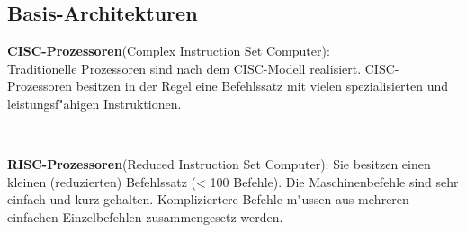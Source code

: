 \subsection{Basis-Architekturen}
\begin{minipage}{9cm}
	\textbf{CISC-Prozessoren}(Complex Instruction Set Computer):\\
	Traditionelle Prozessoren sind nach dem CISC-Modell realisiert. CISC-Prozessoren besitzen in der Regel eine Befehlssatz mit vielen spezialisierten und leistungsf"ahigen Instruktionen.
\end{minipage}
%
\begin{minipage}{0.5cm}
	\ \
\end{minipage}
%
\begin{minipage}{9cm}
	\textbf{RISC-Prozessoren}(Reduced Instruction Set Computer):
	Sie besitzen einen kleinen (reduzierten) Befehlssatz (< 100 Befehle). Die Maschinenbefehle sind sehr einfach und kurz gehalten. Kompliziertere Befehle m"ussen aus mehreren einfachen Einzelbefehlen zusammengesetz werden.
\end{minipage}

